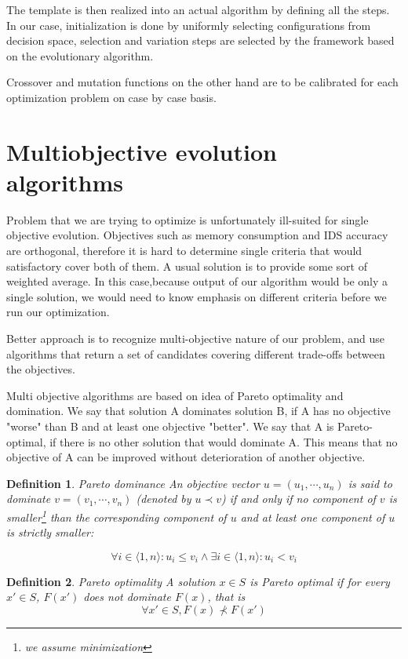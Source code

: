 \documentclass[12pt,oneside]{fithesis2}
\newtheorem{defn}{Definition}
\begin{document}
The template is then realized into an actual algorithm by defining all the steps. In our case, initialization is done by uniformly selecting configurations from decision space, selection and variation steps are selected by the framework based on the evolutionary algorithm. 

Crossover and mutation functions on the other hand are to be calibrated for each optimization problem on case by case basis.

\section{Multiobjective evolution algorithms}
Problem that we are trying to optimize is unfortunately ill-suited for single objective evolution. Objectives such as memory consumption and IDS accuracy are orthogonal, therefore it is hard to determine single criteria that would satisfactory cover both of them. A usual solution is to provide some sort of weighted average. In this case,because output of our algorithm would be only a single solution, we would need to know emphasis on different criteria before we run our optimization. 

Better approach is to recognize multi-objective nature of our problem, and use algorithms that return a set of candidates covering different trade-offs between the objectives. 

Multi objective algorithms are based on idea of Pareto optimality and domination. We say that solution A dominates solution B, if A has no objective "worse" than B and at least one objective "better". We say that A is Pareto-optimal, if there is no other solution that would dominate A. This means that no objective of A can be improved without deterioration of another objective. 

\begin{defn}{Pareto dominance}
An objective vector $u = (u_1,\cdots,u_n)$ is said to dominate $v = (v_1,\cdots,v_n)$ (denoted by $u \prec v$) if and only if no component of $v$ is smaller\footnote{we assume minimization} than the corresponding component of $u$ and at least one component of $u$ is strictly smaller:

$$ \forall i \in \langle 1,n\rangle: u_i \leq v_i \land \exists i \in \langle 1,n\rangle: u_i < v_i $$
\end{defn}

\begin{defn}{Pareto optimality}
A solution $x \in S$ is Pareto optimal if for every $x' \in S$, $F(x')$ does not dominate $F(x)$, that is $$ \forall x' \in S, F(x) \not \prec F(x') $$
\end{defn}
\end{document}
